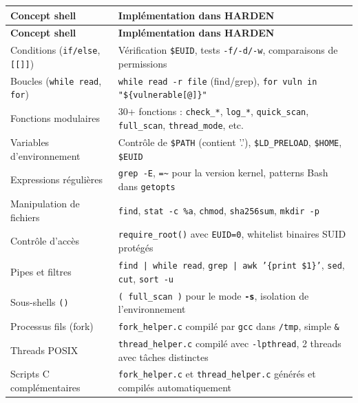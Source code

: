\documentclass[12pt,a4paper]{article}
\newcommand{\opt}[1]{\texttt{\textcolor{bleuMed}{\textbf{#1}}}}
\newcommand{\cmd}[1]{\texttt{\textcolor{codeText}{#1}}}
\newcommand{\fichier}[1]{\texttt{\textcolor{bleuENSET}{#1}}}
\begin{document}
\vspace{6pt}
\begin{longtable}{L{4.2cm} L{9.8cm}}
  \textbf{\color{white}Concept shell} & \textbf{\color{white}Implémentation dans HARDEN} \\
  \endfirsthead
  \textbf{\color{white}Concept shell} & \textbf{\color{white}Implémentation dans HARDEN} \\
  \endhead
  Conditions (\cmd{if/else}, \cmd{[[]]}) & Vérification \cmd{\$EUID}, tests \cmd{-f/-d/-w}, comparaisons de permissions \\
  Boucles (\cmd{while read}, \cmd{for}) & \cmd{while read -r file} (find/grep), \cmd{for vuln in "\$\{vulnerable[@]\}"} \\
  Fonctions modulaires & 30+ fonctions : \cmd{check\_*}, \cmd{log\_*}, \cmd{quick\_scan}, \cmd{full\_scan}, \cmd{thread\_mode}, etc. \\
  Variables d'environnement & Contrôle de \cmd{\$PATH} (contient '.'), \cmd{\$LD\_PRELOAD}, \cmd{\$HOME}, \cmd{\$EUID} \\
  Expressions régulières & \cmd{grep -E}, \cmd{=\textasciitilde} pour la version kernel, patterns Bash dans \cmd{getopts} \\
  Manipulation de fichiers & \cmd{find}, \cmd{stat -c \%a}, \cmd{chmod}, \cmd{sha256sum}, \cmd{mkdir -p} \\
  Contrôle d'accès & \cmd{require\_root()} avec \cmd{EUID=0}, whitelist binaires SUID protégés \\
  Pipes et filtres & \cmd{find | while read}, \cmd{grep | awk '\{print \$1\}'}, \cmd{sed}, \cmd{cut}, \cmd{sort -u} \\
  Sous-shells \cmd{()} & \cmd{( full\_scan )} pour le mode \opt{-s}, isolation de l'environnement \\
  Processus fils (fork) & \fichier{fork\_helper.c} compilé par \cmd{gcc} dans \fichier{/tmp}, simple \cmd{\&} \\
  Threads POSIX & \fichier{thread\_helper.c} compilé avec \cmd{-lpthread}, 2 threads avec tâches distinctes \\
  Scripts C complémentaires & \fichier{fork\_helper.c} et \fichier{thread\_helper.c} générés et compilés automatiquement \\
\end{longtable}
\end{document}
